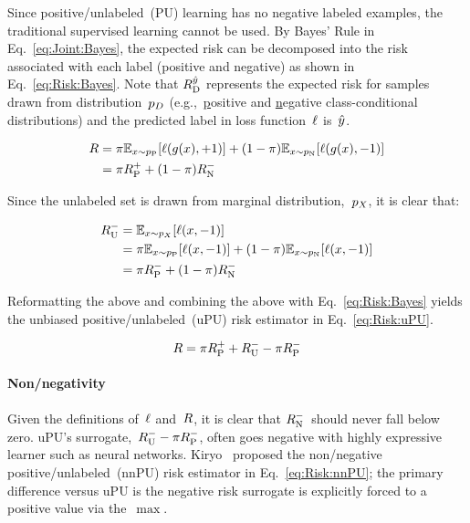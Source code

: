 Since positive\-/unlabeled~(PU) learning has no negative labeled examples, the traditional supervised learning cannot be used. By Bayes' Rule in Eq.~\eqref{eq:Joint:Bayes}, the expected risk can be decomposed into the risk associated with each label (positive and negative) as shown in Eq.~\eqref{eq:Risk:Bayes}.  Note that ${R_{\textnormal{D}}^{\hat{y}}}$ represents the expected risk for samples drawn from distribution~${p_{D}}$ (e.g.,~\underline{p}ositive and \underline{n}egative class-conditional distributions) and the predicted label in loss function~$\ell$ is~$\hat{y}$.

\begin{align}
  R &= \pi \mathbb{E}_{x \sim p_{\textnormal{P}}}\lbrack\ell\mathopen{}\left(g\mathopen{}\left(x\right)\mathclose{},{+}1\right)\mathclose{}\rbrack + (1-\pi) \mathbb{E}_{x \sim p_{\textnormal{N}}}\lbrack\ell\mathopen{}\left(g\mathopen{}\left(x\right)\mathclose{},{-}1\right)\mathclose{}\rbrack \nonumber \\
        &= \pi R_{\textnormal{P}}^{{+}} + (1-\pi) R_{\textnormal{N}}^{{-}} \label{eq:Risk:Bayes}
\end{align}

Since the unlabeled set is drawn from marginal distribution,~$p_{X}$, it is clear that:

\begin{align}
  R_{\textnormal{U}}^{{-}} &= \mathbb{E}_{x \sim p_{X}} \lbrack\ell\mathopen{}\left(x,{-}1\right)\mathclose{}\rbrack \nonumber \\
            &= \pi \mathbb{E}_{x \sim p_{\textnormal{P}}} \lbrack\ell\mathopen{}\left(x,{-}1\right)\mathclose{}\rbrack + (1 - \pi) \mathbb{E}_{x \sim p_{\textnormal{N}}} \lbrack\ell\mathopen{}\left(x,{-}1\right)\mathclose{}\rbrack\nonumber \\
            &= \pi R_{\textnormal{P}}^{{-}} + (1 - \pi) R_{\textnormal{N}}^{{-}} \label{eq:Risk:Unlabeled}
\end{align}

\noindent
Reformatting the above and combining the above with Eq.~\eqref{eq:Risk:Bayes} yields the unbiased positive\-/unlabeled~(uPU) risk estimator in Eq.~\eqref{eq:Risk:uPU}.~\cite{duPlessis:2014}

\begin{equation}\label{eq:Risk:uPU}
  R = \pi R_{\textnormal{P}}^{{+}} + R_{\textnormal{U}}^{{-}} - \pi R_{\textnormal{P}}^{{-}}
\end{equation}

\paragraph{Non\-/negativity} Given the definitions of~$\ell$ and~$R$, it is clear that $R_{\textnormal{N}}^{{-}}$~should never fall below zero.  uPU's surrogate,~${R_{\textnormal{U}}^{{-}} - \pi R_{\textnormal{P}}^{{-}}}$, often goes negative with highly expressive learner such as neural networks.  Kiryo\etal~\cite{Kiryo:2017} proposed the non\-/negative positive\-/unlabeled~(nnPU) risk estimator in Eq.~\eqref{eq:Risk:nnPU}; the primary difference versus uPU is the negative risk surrogate is explicitly forced to a positive value via the~$\max$.

